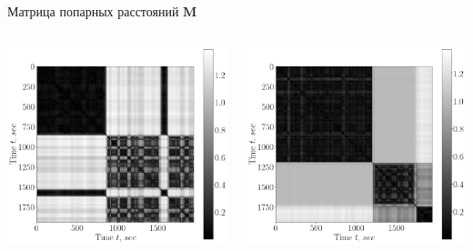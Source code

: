 \documentclass[10pt,pdf,hyperref={unicode}]{beamer}
\begin{document}
\begin{frame}[shrink=5]{Матрица попарных расстояний $\textbf{M}$}
\justifying

\begin{columns}
    \begin{column}{0.35\textwidth}
        \includegraphics[width=1\textwidth]{results/2_patern_2_full}
    \end{column}
    \begin{column}{0.35\textwidth}
        \includegraphics[width=1\textwidth]{results/3_patern_2_full}
    \end{column}
\end{columns}


\end{frame}
\end{document}
